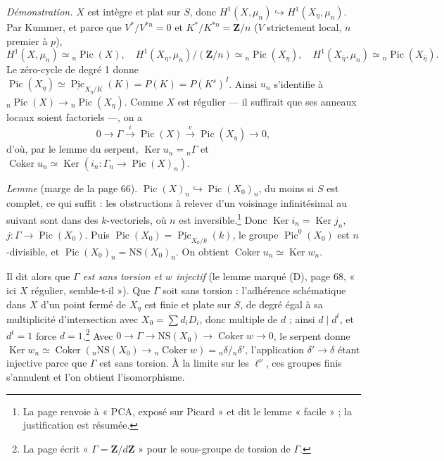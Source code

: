 \documentclass[11pt,a4paper]{article}
\begin{document}
\emph{Démonstration.} $X$ est intègre et plat sur $S$, donc $H^1(X, \mu_n)
\hookrightarrow H^1(X_\eta, \mu_n)$. Par Kummer, et parce que $V^*/V^{*n} = 0$ et
$K^*/K^{*n} = \mathbf{Z}/n$ ($V$ strictement local, $n$ premier à $p$),
\[ H^1(X, \mu_n) \simeq {}_n\operatorname{Pic}(X), \quad H^1(X_\eta,
\mu_n)/(\mathbf{Z}/n) \simeq {}_n\operatorname{Pic}(X_\eta), \quad
H^1(X_{\bar\eta}, \mu_n) \simeq {}_n\operatorname{Pic}(X_{\bar\eta}) . \]
Le zéro-cycle de degré 1 donne $\operatorname{Pic}(X_\eta) \simeq
\underline{\operatorname{Pic}}_{X_\eta/K}(K) = P(K) = P(K^s)^I$. Ainsi $u_n$
s'identifie à ${}_n\operatorname{Pic}(X) \to {}_n\operatorname{Pic}(X_\eta)$.
Comme $X$ est régulier --- il suffirait que ses anneaux locaux soient factoriels
---, on a
\[ 0 \to \Gamma \xrightarrow{i} \operatorname{Pic}(X) \xrightarrow{v}
\operatorname{Pic}(X_\eta) \to 0 , \]
d'où, par le lemme du serpent, $\operatorname{Ker} u_n = {}_n\Gamma$ et
$\operatorname{Coker} u_n \simeq \operatorname{Ker}(i_n\colon \Gamma_n \to
\operatorname{Pic}(X)_n)$.

\emph{Lemme} (marge de la page 66). $\operatorname{Pic}(X)_n \hookrightarrow
\operatorname{Pic}(X_0)_n$, du moins si $S$ est complet, ce qui suffit : les
obstructions à relever d'un voisinage infinitésimal au suivant sont dans des
$k$-vectoriels, où $n$ est inversible.\footnote{La page renvoie à « PCA, exposé
sur Picard » et dit le lemme « facile » ; la justification est résumée.} Donc
$\operatorname{Ker} i_n = \operatorname{Ker} j_n$, $j\colon \Gamma \to
\operatorname{Pic}(X_0)$. Puis $\operatorname{Pic}(X_0) =
\underline{\operatorname{Pic}}_{X_0/k}(k)$, le groupe
$\operatorname{Pic}^0(X_0)$ est $n$-divisible, et $\operatorname{Pic}(X_0)_n =
\mathrm{NS}(X_0)_n$. On obtient $\operatorname{Coker} u_n \simeq
\operatorname{Ker} w_n$.

Il dit alors que \emph{$\Gamma$ est sans torsion et $w$ injectif} (le lemme
marqué (D), page 68, « ici $X$ régulier, semble-t-il »). Que $\Gamma$ soit sans
torsion : l'adhérence schématique dans $X$ d'un point fermé de $X_\eta$ est finie
et plate sur $S$, de degré égal à sa multiplicité d'intersection avec $X_0 =
\sum d_iD_i$, donc multiple de $d$ ; ainsi $d \mid d^t$, et $d^t = 1$ force $d =
1$.\footnote{La page écrit « $\Gamma = \mathbf{Z}/d\mathbf{Z}$ » pour le
sous-groupe de torsion de $\Gamma$.} Avec $0 \to \Gamma \to \mathrm{NS}(X_0) \to
\operatorname{Coker} w \to 0$, le serpent donne $\operatorname{Ker} w_n \simeq
\operatorname{Coker}({}_n\mathrm{NS}(X_0) \to {}_n\operatorname{Coker} w) =
{}_n\delta/{}_n\delta'$, l'application $\delta' \to \delta$ étant injective parce
que $\Gamma$ est sans torsion. À la limite sur les $\ell^\nu$, ces groupes finis
s'annulent et l'on obtient l'isomorphisme.
\end{document}
